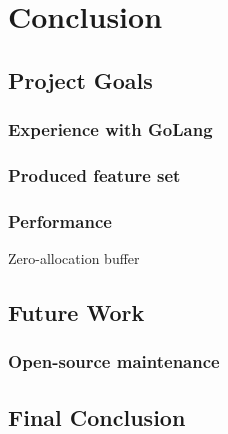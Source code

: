 \chapter{Conclusion}
\label{chap:Conclusion}

\section{Project Goals}
\label{sec:Project Goals}


\subsection{Experience with GoLang}
\label{sub:Experience with GoLang}


\subsection{Produced feature set}
\label{sub:Produced featureset}


\subsection{Performance}
\label{sub:performance}

Zero-allocation buffer \cite{highPerformanceSystemsInGo}


\section{Future Work}
\label{sec:Future Work}


\subsection{Open-source maintenance}
\label{sub:Open-source maintanance}


\section{Final Conclusion}
\label{sec:Final Conclusion}
